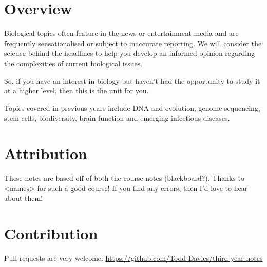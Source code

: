 \section*{Overview}

Biological topics often feature in the news or entertainment media and are
frequently sensationalised or subject to inaccurate reporting.  We will consider
the science behind the headlines to help you develop an informed opinion
regarding the complexities of current biological issues.

So, if you have an interest in biology but haven’t had the opportunity to study
it at a higher level, then this is the unit for you.

Topics covered in previous years include DNA and evolution, genome sequencing,
stem cells, biodiversity, brain function and emerging infectious diseases.

\section*{Attribution}

These notes are based off of both the course notes (blackboard?). Thanks to
<names> for such a good course! If you find any errors, then I'd love to hear
about them!

\section*{Contribution}

Pull requests are very welcome:
\url{https://github.com/Todd-Davies/third-year-notes}